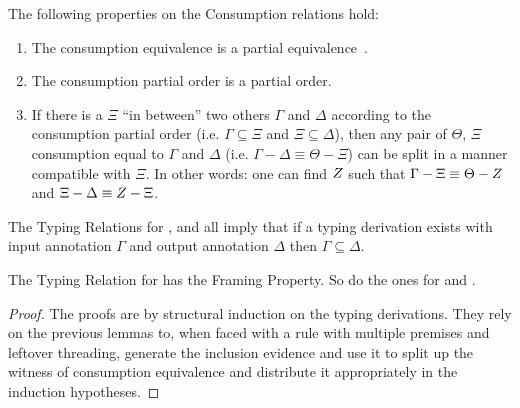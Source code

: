 \begin{lemma} The following properties on the Consumption relations hold:
\begin{enumerate}
  \item The consumption equivalence is a partial equivalence~\cite{mitchell1996foundations}.
  \item The consumption partial order is a partial order.
  \item If there is a \Usages{} \ensuremath{\Xi} ``in between'' two others \ensuremath{\Gamma} and \ensuremath{\Delta} according to
        the consumption partial order (i.e. $\ensuremath{\Gamma} \ensuremath{\subseteq} \ensuremath{\Xi}$ and $\ensuremath{\Xi} \ensuremath{\subseteq} \ensuremath{\Delta}$), then any pair
        of \Usages{} \ensuremath{\Theta}, \ensuremath{\Xi} consumption equal to \ensuremath{\Gamma} and \ensuremath{\Delta} (i.e. \mbox{$\ensuremath{\Gamma} \ensuremath{-} \ensuremath{\Delta} \ensuremath{\equiv} \ensuremath{\Theta} \ensuremath{-} \ensuremath{\Xi}$})
        can be split in a manner compatible with \ensuremath{\Xi}. In other words: one can find
        \ensuremath{\Zeta} such that \mbox{$\Gamma - \Xi \equiv \Theta - Z$} and \mbox{$\Xi - \Delta \equiv Z - \Xi$}.
\end{enumerate}
\end{lemma}

\begin{lemma}[Consumption]The Typing Relations for \Var{}, \Inferable{}
and \Checkable{} all imply that if a typing derivation exists with input
\Usages{} annotation \ensuremath{\Gamma} and output \Usages{} annotation \ensuremath{\Delta} then $\ensuremath{\Gamma} \ensuremath{\subseteq} \ensuremath{\Delta}$.\label{lemma:consumption}
\end{lemma}

\begin{theorem}
\label{theorem:framing}
The Typing Relation for \Var{} has the Framing Property.
So do the ones for \Inferable{} and \Checkable{}.
\end{theorem}
\begin{proof}
The proofs are by structural induction on the typing derivations. They rely on
the previous lemmas to, when faced with a rule with multiple premises and leftover
threading, generate the inclusion evidence and use it to split up the witness
of consumption equivalence and distribute it appropriately in the induction hypotheses.
\end{proof}


